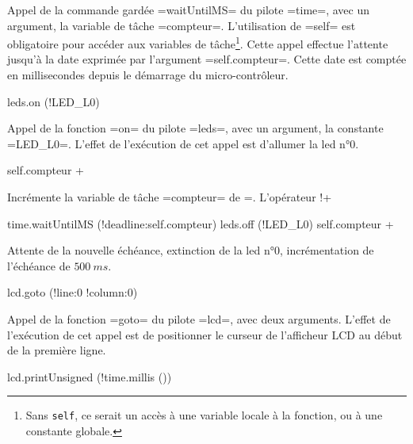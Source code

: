 \begin{OMNIBUS}[1]
Appel de la commande gardée \omnibus=waitUntilMS= du pilote \omnibus=time=, avec un argument, la variable de tâche \omnibus=compteur=. L'utilisation de \omnibus=self= est obligatoire pour accéder aux variables de tâche\footnote{Sans \texttt{self}, ce serait un accès à une variable locale à la fonction, ou à une constante globale.}. Cette appel effectue l'attente jusqu'à la date exprimée par l'argument \omnibus=self.compteur=. Cette date est comptée en millisecondes depuis le démarrage du micro-contrôleur.



\begin{OMNIBUS}[7]
    leds.on (!LED_L0)
\end{OMNIBUS}

Appel de la fonction \omnibus=on= du pilote \omnibus=leds=, avec un argument, la constante \omnibus=LED_L0=. L'effet de l'exécution de cet appel est d'allumer la led n°0.



\begin{OMNIBUS}[8]
    self.compteur +%
\end{OMNIBUS}

Incrémente la variable de tâche \omnibus=compteur= de =. L'opérateur \omnibus!+%


\begin{OMNIBUS}[9]
    time.waitUntilMS (!deadline:self.compteur)
    leds.off (!LED_L0)
    self.compteur +%
\end{OMNIBUS}

Attente de la nouvelle échéance, extinction de la led n°0, incrémentation de l'échéance de $500~ms$.


\begin{OMNIBUS}[12]
    lcd.goto (!line:0 !column:0)
\end{OMNIBUS}

Appel de la fonction \omnibus=goto= du pilote \omnibus=lcd=, avec deux arguments. L'effet de l'exécution de cet appel est de positionner le curseur de l'afficheur LCD au début de la première ligne.




\begin{OMNIBUS}[13]
    lcd.printUnsigned (!time.millis ())
\end{OMNIBUS}


\end{OMNIBUS}
